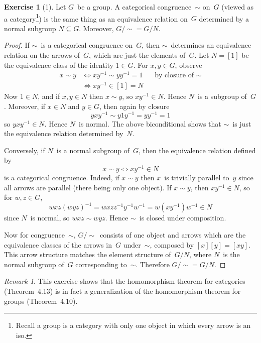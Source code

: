\documentclass[letterpaper,12pt]{article}
\newcommand{\eq}{\sim}
\theoremstyle{definition}
\newtheorem*{exer}{Exercise}
\theoremstyle{remark}
\newtheorem*{rmk}{Remark}
\theoremstyle{direction}
\begin{document}
\begin{exer}[1]
Let \(G\)~be a group. A categorical congruence~\(\eq\) on~\(G\) (viewed as a category\footnote{Recall a group is a category with only one object in which every arrow is an iso.}) is the same thing as an equivalence relation on~\(G\) determined by a normal subgroup \(N\subseteq G\). Moreover, \(G/{\eq}=G/N\).
\end{exer}
\begin{proof}
If \(\eq\)~is a categorical congruence on~\(G\), then \(\eq\)~determines an equivalence relation on the arrows of~\(G\), which are just the elements of~\(G\). Let \(N=[1]\) be the equivalence class of the identity \(1\in G\). For \(x,y\in G\), observe
\begin{align*}
x\eq y&\iff xy^{-1}\eq yy^{-1}=1&&\text{by closure of~\(\eq\)}\\
	&\iff xy^{-1}\in [1]=N
\end{align*}
Now \(1\in N\), and if \(x,y\in N\) then \(x\eq y\), so \(xy^{-1}\in N\). Hence \(N\)~is a subgroup of~\(G\). Moreover, if \(x\in N\) and \(y\in G\), then again by closure
\[yxy^{-1}\eq y1y^{-1}=yy^{-1}=1\]
so \(yxy^{-1}\in N\). Hence \(N\)~is normal. The above biconditional shows that \(\eq\)~is just the equivalence relation determined by~\(N\).

Conversely, if \(N\)~is a normal subgroup of~\(G\), then the equivalence relation defined by
\[x\eq y\iff xy^{-1}\in N\]
is a categorical congruence. Indeed, if \(x\eq y\) then \(x\)~is trivially parallel to~\(y\) since all arrows are parallel (there being only one object). If \(x\eq y\), then \(xy^{-1}\in N\), so for \(w,z\in G\),
\[wxz(wyz)^{-1}=wxzz^{-1}y^{-1}w^{-1}=w(xy^{-1})w^{-1}\in N\]
since \(N\)~is normal, so \(wxz\eq wyz\). Hence \(\eq\)~is closed under composition.

Now for congruence~\(\eq\), \(G/{\eq}\)~consists of one object and arrows which are the equivalence classes of the arrows in~\(G\) under~\(\eq\), composed by \([x][y]=[xy]\). This arrow structure matches the element structure of~\(G/N\), where \(N\)~is the normal subgroup of~\(G\) corresponding to~\(\eq\). Therefore \(G/{\eq}=G/N\).
\end{proof}
\begin{rmk}
This exercise shows that the homomorphism theorem for categories (Theorem~4.13) is in fact a generalization of the homomorphism theorem for groups (Theorem~4.10).
\end{rmk}
\end{document}
